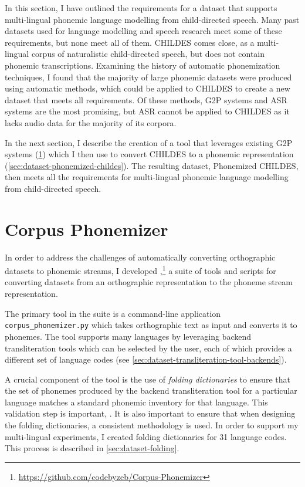 In this section, I have outlined the requirements for a dataset that supports multi-lingual phonemic language modelling from child-directed speech. Many past datasets used for language modelling and speech research meet some of these requirements, but none meet all of them. CHILDES comes close, as a multi-lingual corpus of naturalistic child-directed speech, but does not contain phonemic transcriptions. Examining the history of automatic phonemization techniques, I found that the majority of large phonemic datasets were produced using automatic methods, which could be applied to CHILDES to create a new dataset that meets all requirements. Of these methods, G2P systems and ASR systems are the most promising, but ASR cannot be applied to CHILDES as it lacks audio data for the majority of its corpora. 

In the next section, I describe the creation of a tool that leverages existing G2P systems (\cref{sec:dataset-corpus-phonemizer}) which I then use to convert CHILDES to a phonemic representation (\cref{sec:dataset-phonemized-childes}). The resulting dataset, Phonemized CHILDES, then meets all the requirements for multi-lingual phonemic language modelling from child-directed speech. 


\section{Corpus Phonemizer}
\label{sec:dataset-corpus-phonemizer}

In order to address the challenges of automatically converting orthographic datasets to phonemic streams, I developed \corpusphonemizer,\footnote{\url{https://github.com/codebyzeb/Corpus-Phonemizer}} a suite of tools and scripts for converting datasets from an orthographic representation to the phoneme stream representation.

The primary tool in the suite is a command-line application \texttt{corpus\_phonemizer.py} which takes orthographic text as input and converts it to phonemes. The tool supports many languages by leveraging backend transliteration tools which can be selected by the user, each of which provides a different set of language codes (see \cref{sec:dataset-transliteration-tool-backends}).

A crucial component of the tool is the use of \emph{folding dictionaries} to ensure that the set of phonemes produced by the backend transliteration tool for a particular language matches a standard phonemic inventory for that language. This validation step is important, . It is also important to ensure that when designing the folding dictionaries, a consistent methodology is used. In order to support my multi-lingual experiments, I created folding dictionaries for 31 language codes. This process is described in \cref{sec:dataset-folding}.

